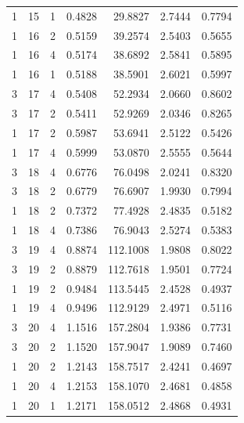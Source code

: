 \begin{tabular}{rrrrrrr}
1 & 15 & 1 & 0.4828 & 29.8827 & 2.7444 & 0.7794 \\
1 & 16 & 2 & 0.5159 & 39.2574 & 2.5403 & 0.5655 \\
1 & 16 & 4 & 0.5174 & 38.6892 & 2.5841 & 0.5895 \\
1 & 16 & 1 & 0.5188 & 38.5901 & 2.6021 & 0.5997 \\
3 & 17 & 4 & 0.5408 & 52.2934 & 2.0660 & 0.8602 \\
3 & 17 & 2 & 0.5411 & 52.9269 & 2.0346 & 0.8265 \\
1 & 17 & 2 & 0.5987 & 53.6941 & 2.5122 & 0.5426 \\
1 & 17 & 4 & 0.5999 & 53.0870 & 2.5555 & 0.5644 \\
3 & 18 & 4 & 0.6776 & 76.0498 & 2.0241 & 0.8320 \\
3 & 18 & 2 & 0.6779 & 76.6907 & 1.9930 & 0.7994 \\
1 & 18 & 2 & 0.7372 & 77.4928 & 2.4835 & 0.5182 \\
1 & 18 & 4 & 0.7386 & 76.9043 & 2.5274 & 0.5383 \\
3 & 19 & 4 & 0.8874 & 112.1008 & 1.9808 & 0.8022 \\
3 & 19 & 2 & 0.8879 & 112.7618 & 1.9501 & 0.7724 \\
1 & 19 & 2 & 0.9484 & 113.5445 & 2.4528 & 0.4937 \\
1 & 19 & 4 & 0.9496 & 112.9129 & 2.4971 & 0.5116 \\
3 & 20 & 4 & 1.1516 & 157.2804 & 1.9386 & 0.7731 \\
3 & 20 & 2 & 1.1520 & 157.9047 & 1.9089 & 0.7460 \\
1 & 20 & 2 & 1.2143 & 158.7517 & 2.4241 & 0.4697 \\
1 & 20 & 4 & 1.2153 & 158.1070 & 2.4681 & 0.4858 \\
1 & 20 & 1 & 1.2171 & 158.0512 & 2.4868 & 0.4931 \\
\bottomrule
\end{tabular}
